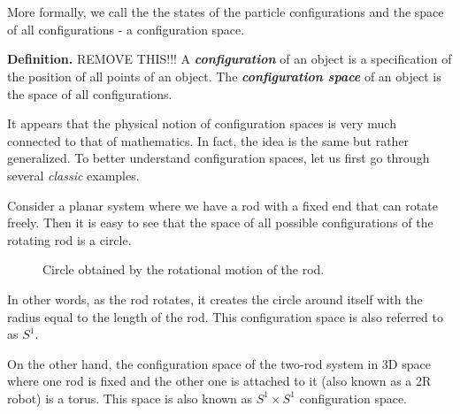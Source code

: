 \documentclass[a4paper, twocolumn]{article}
\theoremstyle{definition}
\begin{document}
\section*{}      %
\vspace{-0.3cm}  %

More formally, we call the the states of the particle configurations
and the space of all configurations - a configuration space.

\textbf{Definition.} REMOVE THIS!!! A \textit{\textbf{configuration}} of an object is a specification of the position of all points of an object.
The \textit{\textbf{configuration space}} of an object is the space of all configurations.

It appears that the physical notion of configuration spaces is very much connected to that of mathematics.
In fact, the idea is the same but rather generalized. To better understand configuration spaces, let us
first go through several \textit{classic} examples.

\medskip

\cite{1} Consider a planar system where we have a rod with a fixed end that can rotate freely. Then it is
easy to see that the space of all possible configurations of the rotating rod is a circle.

\begin{figure}[H]
\centering
{}
\caption*{Circle obtained by the rotational motion of the rod.}
\end{figure}

In other words, as the rod rotates, it creates the circle around itself
with the radius equal to the length of the rod. This configuration space
is also referred to as $S^1$.

\medskip

\cite{2} On the other hand, the configuration space of the two-rod
system in 3D space where one rod is fixed and the other one is attached to it (also known as a 2R robot)
is a torus. This space is also known as $S^1 \times S^1$ configuration space.
\end{document}
